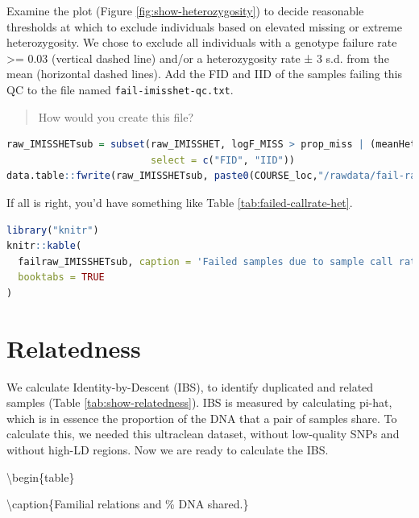 \documentclass[
]{book}
\newcommand{\passthrough}[1]{#1}
\begin{document}
Examine the plot (Figure \ref{fig:show-heterozygosity}) to decide reasonable thresholds at which to exclude individuals based on elevated missing or extreme heterozygosity. We chose to exclude all individuals with a genotype failure rate \textgreater= 0.03 (vertical dashed line) and/or a heterozygosity rate ± 3 s.d. from the mean (horizontal dashed lines). Add the FID and IID of the samples failing this QC to the file named \passthrough{\lstinline!fail-imisshet-qc.txt!}.

\begin{quote}
How would you create this file?
\end{quote}

\begin{lstlisting}[language=R]
raw_IMISSHETsub = subset(raw_IMISSHET, logF_MISS > prop_miss | (meanHet < lower_meanHet | meanHet > upper_meanHet),
                         select = c("FID", "IID"))
data.table::fwrite(raw_IMISSHETsub, paste0(COURSE_loc,"/rawdata/fail-raw_IMISSHETsub.txt"), sep =" ")
\end{lstlisting}

If all is right, you'd have something like Table \ref{tab:failed-callrate-het}.

\begin{lstlisting}[language=R]
library("knitr")
knitr::kable(
  failraw_IMISSHETsub, caption = 'Failed samples due to sample call rates and heterozygosity rate',
  booktabs = TRUE
)
\end{lstlisting}

\hypertarget{relatedness}{%
\section{Relatedness}\label{relatedness}}

We calculate Identity-by-Descent (IBS), to identify duplicated and related samples (Table \ref{tab:show-relatedness}). IBS is measured by calculating pi-hat, which is in essence the proportion of the DNA that a pair of samples share. To calculate this, we needed this ultraclean dataset, without low-quality SNPs and without high-LD regions. Now we are ready to calculate the IBS.

\textbackslash begin\{table\}

\textbackslash caption\{\label{tab:show-relatedness}Familial relations and \% DNA shared.\}
\centering
\end{document}
